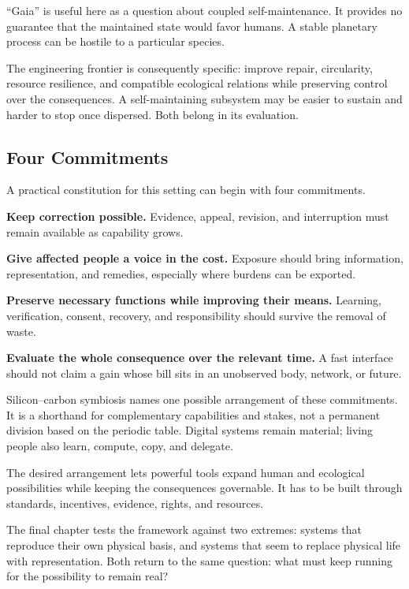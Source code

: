 “Gaia” is useful here as a question about coupled self-maintenance. It provides no guarantee that the maintained state would favor humans. A stable planetary process can be hostile to a particular species.

The engineering frontier is consequently specific: improve repair, circularity, resource resilience, and compatible ecological relations while preserving control over the consequences. A self-maintaining subsystem may be easier to sustain and harder to stop once dispersed. Both belong in its evaluation.

\subsection{Four Commitments}

A practical constitution for this setting can begin with four commitments.

\textbf{Keep correction possible.} Evidence, appeal, revision, and interruption must remain available as capability grows.

\textbf{Give affected people a voice in the cost.} Exposure should bring information, representation, and remedies, especially where burdens can be exported.

\textbf{Preserve necessary functions while improving their means.} Learning, verification, consent, recovery, and responsibility should survive the removal of waste.

\textbf{Evaluate the whole consequence over the relevant time.} A fast interface should not claim a gain whose bill sits in an unobserved body, network, or future.

Silicon--carbon symbiosis names one possible arrangement of these commitments. It is a shorthand for complementary capabilities and stakes, not a permanent division based on the periodic table. Digital systems remain material; living people also learn, compute, copy, and delegate.

The desired arrangement lets powerful tools expand human and ecological possibilities while keeping the consequences governable. It has to be built through standards, incentives, evidence, rights, and resources.

The final chapter tests the framework against two extremes: systems that reproduce their own physical basis, and systems that seem to replace physical life with representation. Both return to the same question: what must keep running for the possibility to remain real?

